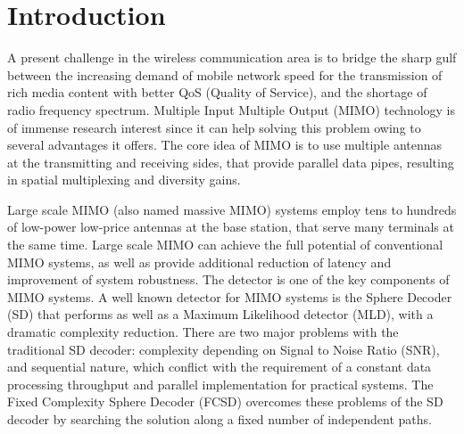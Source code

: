 \documentclass[letterpaper, 10pt, conference, twoside]{ieeeconf}
\begin{document}
\section{Introduction}
A present challenge in the wireless communication area is to bridge the sharp gulf between the increasing demand of mobile network speed for the transmission of rich media content with better QoS (Quality of Service), and the shortage of radio frequency spectrum. Multiple Input Multiple Output (MIMO) technology is of immense research interest since it can help solving this problem owing to several advantages it offers. The core idea of MIMO is to use multiple antennas at the transmitting and receiving sides, that provide parallel data pipes, resulting in spatial multiplexing and diversity gains\cite{oestges2010mimo}. 

Large scale MIMO (also named massive MIMO) systems employ tens to hundreds of low-power low-price antennas at the base station, that serve many terminals at the same time\cite{rusek2013scaling}. Large scale MIMO can achieve the full potential of conventional MIMO systems, as well as provide additional reduction of latency and improvement of system robustness. The detector is one of the key components of MIMO systems.
 A well known detector for MIMO systems is the Sphere Decoder (SD) that performs as well as a Maximum Likelihood detector (MLD), with a dramatic complexity reduction\cite{viterbo1999universal}\cite{hassibi2005sphere}. There are two major problems with the traditional SD decoder: complexity depending on Signal to Noise Ratio (SNR), and sequential nature, which conflict with the requirement of a constant data processing throughput and parallel implementation for practical systems. The Fixed Complexity Sphere Decoder (FCSD) overcomes these problems of the SD decoder by searching the solution along a fixed number of independent paths\cite{barbero2008fixing}.
 
\end{document}
